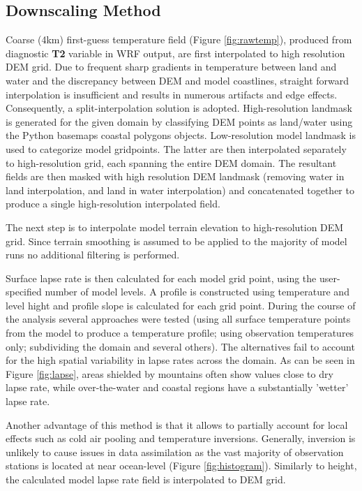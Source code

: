 \documentclass{article}
\begin{document}
\subsection{Downscaling Method}
Coarse (4km) first-guess temperature field (Figure \ref{fig:rawtemp}), produced from diagnostic \textbf{T2} variable in WRF output, are first interpolated to high resolution DEM grid. Due to frequent sharp gradients in temperature between land and water and the discrepancy between DEM and model coastlines, straight forward interpolation is insufficient and results in numerous artifacts and edge effects. Consequently, a split-interpolation solution is adopted. High-resolution landmask is generated for the given domain by classifying DEM points as land/water using the Python basemaps coastal polygons objects. Low-resolution model landmask is used to categorize model gridpoints. The latter are then interpolated separately to high-resolution grid, each spanning the entire DEM domain. The resultant fields are then masked with high resolution DEM landmask (removing water in land interpolation, and land in water interpolation) and concatenated together to produce a single high-resolution interpolated field. 

The next step is to interpolate model terrain elevation to high-resolution DEM grid. Since terrain smoothing is assumed to be applied to the majority of model runs no additional filtering is performed. 

Surface lapse rate is then calculated for each model grid point, using the user-specified number of model levels. A profile is constructed using temperature and level hight and profile slope is calculated for each grid point. During the course of the analysis several approaches were tested (using all surface temperature points from the model to produce a temperature profile; using observation temperatures only; subdividing the domain and several others). The alternatives fail to account for the high spatial variability in lapse rates across the domain. As can be seen in Figure \ref{fig:lapse}, areas shielded by mountains often show values close to dry lapse rate, while over-the-water and coastal regions have a substantially 'wetter' lapse rate. 

Another advantage of this method is that it allows to partially account for local effects such as cold air pooling and temperature inversions. Generally, inversion is unlikely to cause issues in data assimilation as the vast majority of observation stations is located at near ocean-level (Figure \ref{fig:histogram}). Similarly to height, the calculated model lapse rate field is interpolated to DEM grid. 
\end{document}
